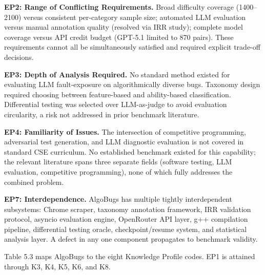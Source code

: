 \textbf{EP2: Range of Conflicting Requirements.} Broad difficulty coverage (1400--2100) versus consistent per-category sample size; automated LLM evaluation versus manual annotation quality (resolved via IRR study); complete model coverage versus API credit budget (GPT-5.1 limited to 870 pairs). These requirements cannot all be simultaneously satisfied and required explicit trade-off decisions.

\textbf{EP3: Depth of Analysis Required.} No standard method existed for evaluating LLM fault-exposure on algorithmically diverse bugs. Taxonomy design required choosing between feature-based and ability-based classification. Differential testing was selected over LLM-as-judge to avoid evaluation circularity, a risk not addressed in prior benchmark literature.

\textbf{EP4: Familiarity of Issues.} The intersection of competitive programming, adversarial test generation, and LLM diagnostic evaluation is not covered in standard CSE curriculum. No established benchmark existed for this capability; the relevant literature spans three separate fields (software testing, LLM evaluation, competitive programming), none of which fully addresses the combined problem.

\textbf{EP7: Interdependence.} AlgoBugs has multiple tightly interdependent subsystems: Chrome scraper, taxonomy annotation framework, IRR validation protocol, asyncio evaluation engine, OpenRouter API layer, g++ compilation pipeline, differential testing oracle, checkpoint/resume system, and statistical analysis layer. A defect in any one component propagates to benchmark validity.

Table 5.3 maps AlgoBugs to the eight Knowledge Profile codes. EP1 is attained through K3, K4, K5, K6, and K8.

